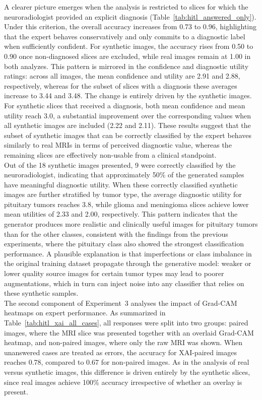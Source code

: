 A clearer picture emerges when the analysis is restricted to slices for which the neuroradiologist provided an explicit diagnosis (Table~\ref{tab:hitl_answered_only}). Under this criterion, the overall accuracy increases from 0.73 to 0.96, highlighting that the expert behaves conservatively and only commits to a diagnostic label when sufficiently confident. For synthetic images, the accuracy rises from 0.50 to 0.90 once non-diagnosed slices are excluded, while real images remain at 1.00 in both analyzes. This pattern is mirrored in the confidence and diagnostic utility ratings: across all images, the mean confidence and utility are 2.91 and 2.88, respectively, whereas for the subset of slices with a diagnosis these averages increase to 3.44 and 3.48. The change is entirely driven by the synthetic images. For synthetic slices that received a diagnosis, both mean confidence and mean utility reach 3.0, a substantial improvement over the corresponding values when all synthetic images are included (2.22 and 2.11). These results suggest that the subset of synthetic images that can be correctly classified by the expert behaves similarly to real MRIs in terms of perceived diagnostic value, whereas the remaining slices are effectively non-usable from a clinical standpoint.\\

Out of the 18 synthetic images presented, 9 were correctly classified by the neuroradiologist, indicating that approximately 50\% of the generated samples have meaningful diagnostic utility. When these correctly classified synthetic images are further stratified by tumor type, the average diagnostic utility for pituitary tumors reaches 3.8, while glioma and meningioma slices achieve lower mean utilities of 2.33 and 2.00, respectively. This pattern indicates that the generator produces more realistic and clinically useful images for pituitary tumors than for the other classes, consistent with the findings from the previous experiments, where the pituitary class also showed the strongest classification performance. A plausible explanation is that imperfections or class imbalance in the original training dataset propagate through the generative model: weaker or lower quality source images for certain tumor types may lead to poorer augmentations, which in turn can inject noise into any classifier that relies on these synthetic samples.\\

The second component of Experiment~3 analyses the impact of Grad-CAM heatmaps on expert performance. As summarized in Table~\ref{tab:hitl_xai_all_cases}, all responses were split into two groups: paired images, where the MRI slice was presented together with an overlaid Grad-CAM heatmap, and non-paired images, where only the raw MRI was shown. When unanswered cases are treated as errors, the accuracy for XAI-paired images reaches 0.78, compared to 0.67 for non-paired images. As in the analysis of real versus synthetic images, this difference is driven entirely by the synthetic slices, since real images achieve 100\% accuracy irrespective of whether an overlay is present.\\

